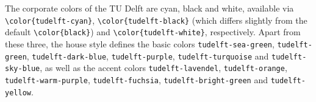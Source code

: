 The corporate colors of the TU Delft are cyan, black and white, available via \texttt{\textbackslash color\{{\color{tudelft-cyan}tudelft-cyan}\}}, \texttt{\textbackslash color\{{\color{tudelft-black}tudelft-black}\}} (which differs slightly from the default \texttt{\textbackslash color\{black\}}) and \texttt{\textbackslash color\{tudelft-white\}}, respectively. Apart from these three, the house style defines the basic colors \texttt{\color{tudelft-sea-green}tudelft-sea-green}, \texttt{\color{tudelft-green}tudelft-green}, \texttt{\color{tudelft-dark-blue}tudelft-dark-blue}, \texttt{\color{tudelft-purple}tudelft-purple}, \texttt{\color{tudelft-turquoise}tudelft-turquoise} and \texttt{\color{tudelft-sky-blue}tudelft-sky-blue}, as well as the accent colors \texttt{\color{tudelft-lavendel}tudelft-lavendel}, \texttt{\color{tudelft-orange}tudelft-orange}, \texttt{\color{tudelft-warm-purple}tudelft-warm-purple}, \texttt{\color{tudelft-fuchsia}tudelft-fuchsia}, \texttt{\color{tudelft-bright-green}tudelft-bright-green} and \texttt{\color{tudelft-yellow}tudelft-yellow}.

